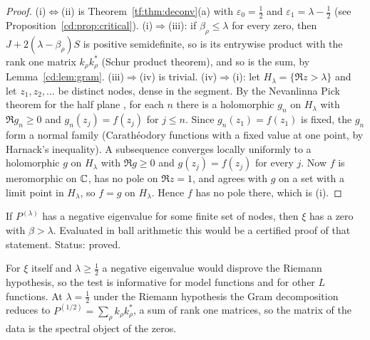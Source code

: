 \begin{proof}
(i)$\Leftrightarrow$(ii) is Theorem~\ref{tf:thm:deconv}(a) with $\varepsilon_0=\tfrac12$ and $\varepsilon_1=\lambda-\tfrac12$ (see Proposition~\ref{cd:prop:critical}). (i)$\Rightarrow$(iii): if $\beta_\rho\le\lambda$ for every zero, then $J+2(\lambda-\beta_\rho)S$ is positive semidefinite, so is its entrywise product with the rank one matrix $k_\rho k_\rho^*$ (Schur product theorem), and so is the sum, by Lemma~\ref{cd:lem:gram}. (iii)$\Rightarrow$(iv) is trivial. (iv)$\Rightarrow$(i): let $H_\lambda=\{\Re z>\lambda\}$ and let $z_1,z_2,\dots$ be distinct nodes, dense in the segment. By the Nevanlinna Pick theorem for the half plane \cite{Donoghue74}, for each $n$ there is a holomorphic $g_n$ on $H_\lambda$ with $\Re g_n\ge0$ and $g_n(z_j)=f(z_j)$ for $j\le n$. Since $g_n(z_1)=f(z_1)$ is fixed, the $g_n$ form a normal family (Carath\'eodory functions with a fixed value at one point, by Harnack's inequality). A subsequence converges locally uniformly to a holomorphic $g$ on $H_\lambda$ with $\Re g\ge0$ and $g(z_j)=f(z_j)$ for every $j$. Now $f$ is meromorphic on $\mathbb{C}$, has no pole on $\Re z=1$, and agrees with $g$ on a set with a limit point in $H_\lambda$, so $f=g$ on $H_\lambda$. Hence $f$ has no pole there, which is (i).
\end{proof}

\begin{corollary}\label{cd:cor:cert}
If $P^{(\lambda)}$ has a negative eigenvalue for some finite set of nodes, then $\xi$ has a zero with $\beta>\lambda$. Evaluated in ball arithmetic this would be a certified proof of that statement. Status: proved.
\end{corollary}

For $\xi$ itself and $\lambda\ge\tfrac12$ a negative eigenvalue would disprove the Riemann hypothesis, so the test is informative for model functions and for other $L$ functions. At $\lambda=\tfrac12$ under the Riemann hypothesis the Gram decomposition reduces to $P^{(1/2)}=\sum_\rho k_\rho k_\rho^*$, a sum of rank one matrices, so the matrix of the data is the spectral object of the zeros.

